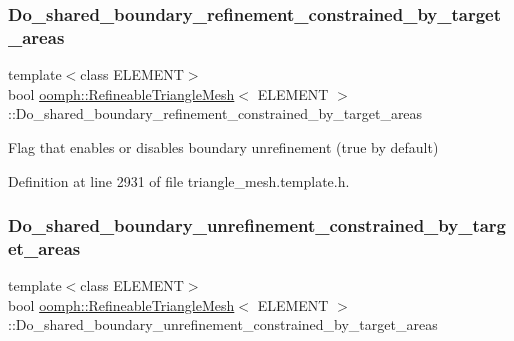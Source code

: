 \subsubsection{\texorpdfstring{Do\+\_\+shared\+\_\+boundary\+\_\+refinement\+\_\+constrained\+\_\+by\+\_\+target\+\_\+areas}{Do\_shared\_boundary\_refinement\_constrained\_by\_target\_areas}}
{\footnotesize\ttfamily template$<$class E\+L\+E\+M\+E\+NT$>$ \\
bool \hyperlink{classoomph_1_1RefineableTriangleMesh}{oomph\+::\+Refineable\+Triangle\+Mesh}$<$ E\+L\+E\+M\+E\+NT $>$\+::Do\+\_\+shared\+\_\+boundary\+\_\+refinement\+\_\+constrained\+\_\+by\+\_\+target\+\_\+areas\hspace{0.3cm}{\ttfamily [protected]}}



Flag that enables or disables boundary unrefinement (true by default) 



Definition at line 2931 of file triangle\+\_\+mesh.\+template.\+h.

\mbox{\label{classoomph_1_1RefineableTriangleMesh_a33354e28a1dc5f457f7e22ae19c1db4f}} 
\subsubsection{\texorpdfstring{Do\+\_\+shared\+\_\+boundary\+\_\+unrefinement\+\_\+constrained\+\_\+by\+\_\+target\+\_\+areas}{Do\_shared\_boundary\_unrefinement\_constrained\_by\_target\_areas}}
{\footnotesize\ttfamily template$<$class E\+L\+E\+M\+E\+NT$>$ \\
bool \hyperlink{classoomph_1_1RefineableTriangleMesh}{oomph\+::\+Refineable\+Triangle\+Mesh}$<$ E\+L\+E\+M\+E\+NT $>$\+::Do\+\_\+shared\+\_\+boundary\+\_\+unrefinement\+\_\+constrained\+\_\+by\+\_\+target\+\_\+areas\hspace{0.3cm}{\ttfamily [protected]}}



